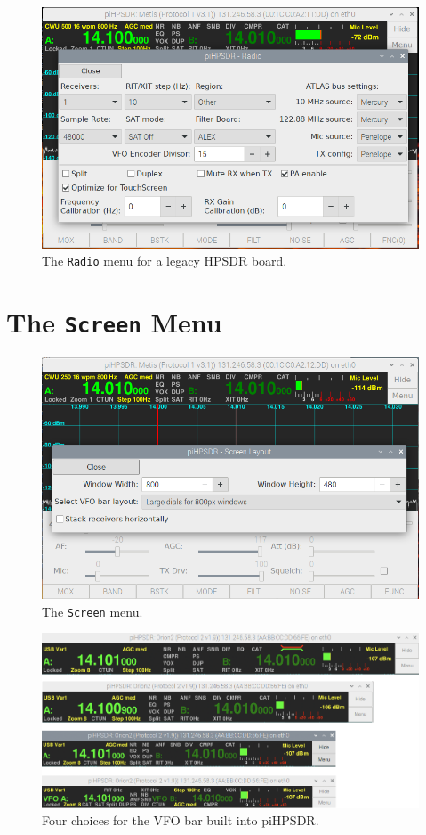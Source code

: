 \documentclass[12pt]{book}
\def\bltt#1{\texttt{\color{blue}#1}}
\begin{document}
\begin{figure}[h]
\center
\includegraphics[width=12cm]{RadioMenuMetis.png}
\caption{The \bltt{Radio} menu for a legacy HPSDR board.}
\label{fig:RadioMenuMetis}
\end{figure}

\section{The \texttt{Screen} Menu}

\begin{figure}[h]
\center
\includegraphics[width=12cm]{ScreenMenu.png}
\caption{The \texttt{Screen} menu.}
\end{figure}

\begin{figure}[h]
\center
\includegraphics[width=12cm]{VFObarChoice.png}
\caption{Four choices for the VFO bar built into piHPSDR.}
\label{fig:VFObarChoice}
\end{figure}
\end{document}
